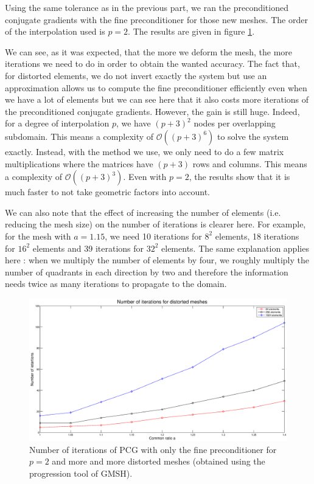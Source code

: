 Using the same tolerance as in the previous part, we ran the preconditioned conjugate gradients with the fine preconditioner for those new meshes. The order of the interpolation used is $p=2$. The results are given in figure \ref{fine_dist_iter}.

We can see, as it was expected, that the more we deform the mesh, the more iterations we need to do in order to obtain the wanted accuracy. The fact that, for distorted elements, we do not invert exactly the system but use an approximation allows us to compute the fine preconditioner efficiently even when we have a lot of elements but we can see here that it also costs more iterations of the preconditioned conjugate gradients. However, the gain is still huge. Indeed, for a degree of interpolation $p$, we have $(p+3)^2$ nodes per overlapping subdomain. This means a complexity of $\mathcal{O}((p+3)^6)$ to solve the system exactly. Instead, with the method we use, we only need to do a few matrix multiplications where the matrices have $(p+3)$ rows and columns. This means a complexity of $\mathcal{O}((p+3)^3)$. Even with $p=2$, the results show that it is much faster to not take geometric factors into account. 

We can also note that the effect of increasing the number of elements (i.e. reducing the mesh size) on the number of iterations is clearer here. For example, for the mesh with $a = 1.15$, we need 10 iterations for $8^2$ elements, 18 iterations for $16^2$ elements and 39 iterations for $32^2$ elements. The same explanation applies here : when we multiply the number of elements by four, we roughly multiply the number of quadrants in each direction by two and therefore the information needs twice as many iterations to propagate to the domain. 

\begin{figure}
\centering
\includegraphics[scale=0.35]{Results/fine_dist_iter.eps}
\caption{Number of iterations of PCG with only the fine preconditioner for $p=2$ and more and more distorted meshes (obtained using the progression tool of GMSH).}
\label{fine_dist_iter}
\end{figure}



